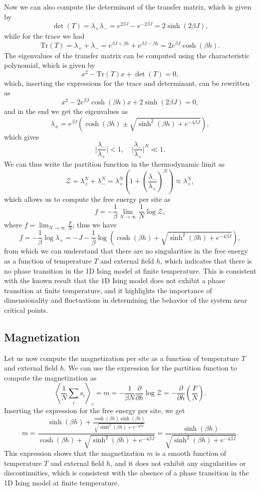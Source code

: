 Now we can also compute the determinant of the transfer matrix, which is given by
\[
    \det(T) = \lambda_+ \lambda_- = e^{2\beta J} - e^{-2\beta J} = 2 \sinh(2\beta J),
\]
while for the trace we had
\[
    \text{Tr}(T) = \lambda_+ + \lambda_- = e^{\beta J + \beta h} + e^{\beta J - \beta h} = 2 e^{\beta J} \cosh(\beta h).
\]
The eigenvalues of the transfer matrix can be computed using the characteristic polynomial, which is given by
\[
    x^2 - \text{Tr}(T) x + \det(T) = 0,
\]
which, inserting the expressions for the trace and determinant, can be rewritten as
\[
    x^2 - 2 e^{\beta J} \cosh(\beta h) x + 2 \sinh(2\beta J) = 0,
\]
and in the end we get the eigenvalues as
\[
    \lambda_{\pm} = e^{\beta J} \left(\cosh(\beta h) \pm \sqrt{\sinh^2(\beta h) + e^{-4\beta J}}\right),
\]
which gives
\[
    \vert \frac{\lambda_-}{\lambda_+} \vert <1 , \quad \vert \frac{\lambda_-}{\lambda_+} \vert^N \ll 1.
\]
We can thus write the partition function in the thermodynamic limit as
\[
    \mathcal{Z} = \lambda_+^N + \lambda_-^N = \lambda_+^N \left(1 + \left(\frac{\lambda_-}{\lambda_+}\right)^N\right) \approx \lambda_+^N,
\]
which allows us to compute the free energy per site as
\[
    f = -\frac{1}{\beta} \lim_{N \to \infty} \frac{1}{N} \log \mathcal{Z},
\]
where \(f = \lim_{N \to \infty} \frac{F}{N}\); thus we have
\[
    f = -\frac{1}{\beta} \log \lambda_+ = -J - \frac{1}{\beta} \log\left( \cosh(\beta h) + \sqrt{\sinh^2(\beta h) + e^{-4\beta J}} \right),
\]
from which we can understand that there are no singularities in the free energy as a function of temperature \(T\) and external field \(h\), which indicates that there is no phase transition in the 1D Ising model at finite temperature. This is consistent with the known result that the 1D Ising model does not exhibit a phase transition at finite temperature, and it highlights the importance of dimensionality and fluctuations in determining the behavior of the system near critical points.

\subsection{Magnetization}

Let us now compute the magnetization per site as a function of temperature \(T\) and external field \(h\). We can use the expression for the partition function to compute the magnetization as
\[
    \left\langle \frac{1}{N} \sum_{i} s_i \right\rangle_c = m = -\frac{1}{\beta N} \frac{\partial}{\partial h} \log \mathcal{Z} = - \frac{\partial}{\partial h} \left(\frac{F}{N}\right).
\]
Inserting the expression for the free energy per site, we get
\[
    m = \frac{\sinh(\beta h) + \frac{\cosh(\beta h) \sinh(\beta h)}{\sqrt{\sinh^2(\beta h) + e^{-4\beta J}} }}{\cosh(\beta h) + \sqrt{\sinh^2(\beta h) + e^{-4\beta J}} } = \frac{\sinh(\beta h)}{\sqrt{\sinh^2(\beta h) + e^{-4\beta J}}}.
\]
This expression shows that the magnetization \(m\) is a smooth function of temperature \(T\) and external field \(h\), and it does not exhibit any singularities or discontinuities, which is consistent with the absence of a phase transition in the 1D Ising model at finite temperature.

